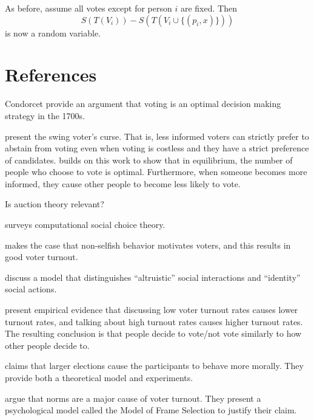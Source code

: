 \documentclass{article}
\DeclareMathOperator*{\argmin}{arg\,min}
\newcommand{\loss}{\ell}
\newcommand{\sloss}{S}
\newcommand{\x}{x}
\newcommand{\xhat}{\hat\x}
\newcommand{\xhato}{\xhat^{\textit{oracle}}}
\newcommand{\V}{V}
\newcommand{\T}{T}
\theoremstyle{definition}
\begin{document}
As before, assume all votes except for person $i$ are fixed.
Then
\begin{equation}
\sloss(\T(\V_i)) - \sloss(\T(\V_i\cup\{(p_i,\x)\}))
\end{equation}
is now a random variable.


\clearpage

\section{References}

Condorcet provide an argument that voting is an optimal decision making strategy in the 1700s.

\cite{feddersen1996swing} present the swing voter's curse.
That is, less informed voters can strictly prefer to abstain from voting even when voting is costless and they have a strict preference of candidates.
\cite{mcmurray2012aggregating} builds on this work to show that in equilibrium, the number of people who choose to vote is optimal.
Furthermore, when someone becomes more informed, they cause other people to become less likely to vote.

Is auction theory relevant?

\cite{chevaleyre2007short} surveys computational social choice theory.

\cite{edlin2007voting} makes the case that non-selfish behavior motivates voters, and this results in good voter turnout.

\cite{fowler2007beyond} discuss a model that distinguishes ``altruistic'' social interactions and ``identity'' social actions.

\cite{gerber2009descriptive} present empirical evidence that discussing low voter turnout rates causes lower turnout rates, and talking about high turnout rates causes higher turnout rates.
The resulting conclusion is that people decide to vote/not vote similarly to how other people decide to.

\cite{feddersen2009moral} claims that larger elections cause the participants to behave more morally.
They provide both a theoretical model and experiments.

\cite{kroneberg2010norms} argue that norms are a major cause of voter turnout.
They present a psychological model called the Model of Frame Selection to justify their claim.
\end{document}
